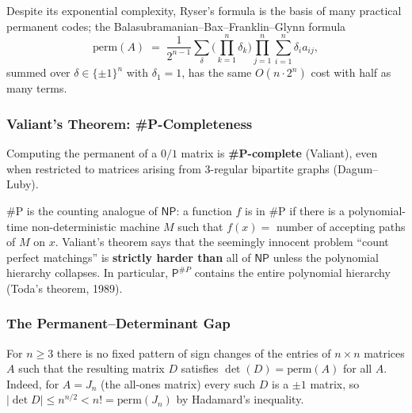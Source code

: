\begin{remark}
Despite its exponential complexity, Ryser's formula is the basis of
many practical permanent codes; the Balasubramanian--Bax--Franklin--Glynn
formula
\[
  \mathrm{perm}(A) \;=\; \frac{1}{2^{n-1}} \sum_{\delta} \Big(\prod_{k = 1}^{n} \delta_k\Big) \prod_{j = 1}^{n} \sum_{i = 1}^{n} \delta_i a_{ij},
\]
summed over $\delta \in \{\pm 1\}^n$ with $\delta_1 = 1$, has the same
$O(n \cdot 2^n)$ cost with half as many terms.
\end{remark}

\subsubsection{Valiant's Theorem: \#P-Completeness}

\begin{theorem}\label{thm:valiant}
Computing the permanent of a $0/1$ matrix is \textbf{\#P-complete}
(Valiant), even when restricted to matrices arising from $3$-regular
bipartite graphs (Dagum--Luby).
\end{theorem}

\begin{remark}
\#P is the counting analogue of $\mathsf{NP}$: a function $f$ is in
\#P if there is a polynomial-time non-deterministic machine $M$ such
that $f(x) = $ number of accepting paths of $M$ on $x$. Valiant's
theorem says that the seemingly innocent problem ``count perfect
matchings'' is \textbf{strictly harder than} all of $\mathsf{NP}$
unless the polynomial hierarchy collapses. In particular,
$\mathsf{P}^{\#P}$ contains the entire polynomial hierarchy
(Toda's theorem, 1989).
\end{remark}

\subsubsection{The Permanent--Determinant Gap}

\begin{theorem}\label{thm:polya}
For $n \ge 3$ there is no fixed pattern of sign changes of the entries
of $n \times n$ matrices $A$ such that the resulting matrix $D$
satisfies $\det(D) = \mathrm{perm}(A)$ for all $A$. Indeed, for
$A = J_n$ (the all-ones matrix) every such $D$ is a $\pm 1$ matrix, so
$|\det D| \le n^{n/2} < n! = \mathrm{perm}(J_n)$ by Hadamard's
inequality.
\end{theorem}

